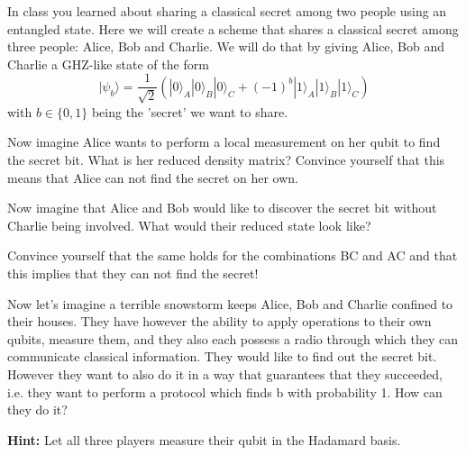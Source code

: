 \documentclass[a4paper,10pt,landscape,twocolumn]{scrartcl}
\newcommand{\ket}[1]{| #1 \rangle}
\begin{document}
\begin{exercise}

In class you learned about sharing a classical secret among two people using an entangled state. Here we will create a scheme that shares a classical secret among three people: Alice, Bob and Charlie. We will do that by giving Alice, Bob and Charlie a GHZ-like state of the form
\[ \ket{\psi_b} = \frac{1}{\sqrt{2}} (\ket{0}_A\ket{0}_B \ket{0}_C + (-1)^b \ket{1}_A\ket{1}_B \ket{1}_C)\]
with $b \in \{0,1\}$ being the 'secret' we want to share. 

\begin{subex}
Now imagine Alice wants to perform a local measurement on her qubit to find the secret bit. What is her reduced density matrix? Convince yourself that this means that Alice can not find the secret on her own.
\end{subex}

\begin{subex}
Now imagine that Alice and Bob would like to discover the secret bit without Charlie being involved. What would their reduced state look like?

Convince yourself that the same holds for the combinations BC and AC and that this implies that they can not find the secret!
\end{subex}

\begin{subex}
Now let's imagine a terrible snowstorm keeps Alice, Bob and Charlie confined to their houses. They have however the ability to apply operations to their own qubits, measure them, and they also each possess a radio through which they can communicate classical information. They would like to find out the secret bit. However they want to also do it in a way that guarantees that they succeeded, i.e. they want to perform a protocol which finds b with probability 1. How can they do it?

{\bf Hint:} Let all three players measure their qubit in the Hadamard basis.
\end{subex}
\end{exercise}
\end{document}
